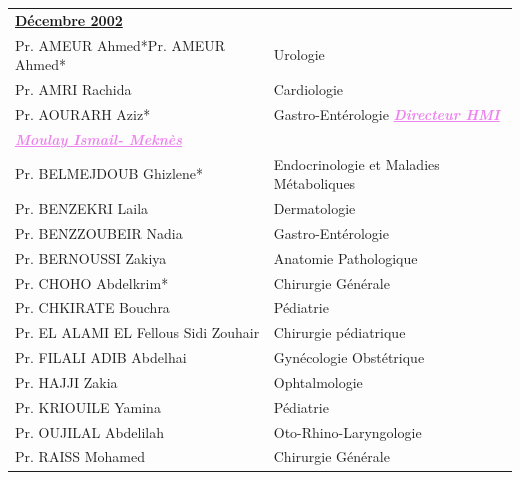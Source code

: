  \begin{table}[H]

          \begin{tabular}{l l}
           \multicolumn{2}{l}{\textbf{\underline{Décembre 2002}}}\vspace*{0.5em}\\
           Pr. AMEUR Ahmed*Pr. AMEUR Ahmed* & \hspace*{2em} Urologie \\
           Pr. AMRI Rachida & \hspace*{2em} Cardiologie  \\
           Pr. AOURARH Aziz* & \hspace*{2em} Gastro-Entérologie \textcolor{violet}{\textbf{\emph{\underline{Directeur HMI }}}} \\
           \textcolor{violet}{\textbf{\emph{\underline{ Moulay Ismail- Meknès}}}} &  \\
           Pr. BELMEJDOUB Ghizlene*	& \hspace*{2em} Endocrinologie et Maladies Métaboliques \\
           Pr. BENZEKRI Laila & \hspace*{2em} Dermatologie\\
           Pr. BENZZOUBEIR Nadia & \hspace*{2em} Gastro-Entérologie\\
           Pr. BERNOUSSI Zakiya & \hspace*{2em} Anatomie Pathologique\\
           Pr. CHOHO Abdelkrim*  & \hspace*{2em} Chirurgie Générale \\
           Pr. CHKIRATE Bouchra  & \hspace*{2em} Pédiatrie \\
           Pr. EL ALAMI EL Fellous Sidi Zouhair	  & \hspace*{2em} Chirurgie pédiatrique \\
           Pr. FILALI ADIB Abdelhai & \hspace*{2em} Gynécologie Obstétrique \\
           Pr. HAJJI Zakia & \hspace*{2em} Ophtalmologie \\
           Pr. KRIOUILE Yamina & \hspace*{2em} Pédiatrie \\
           Pr. OUJILAL Abdelilah	 & \hspace*{2em} Oto-Rhino-Laryngologie \\
           Pr. RAISS Mohamed & \hspace*{2em} Chirurgie Générale \\

          \end{tabular}
\end{table}


